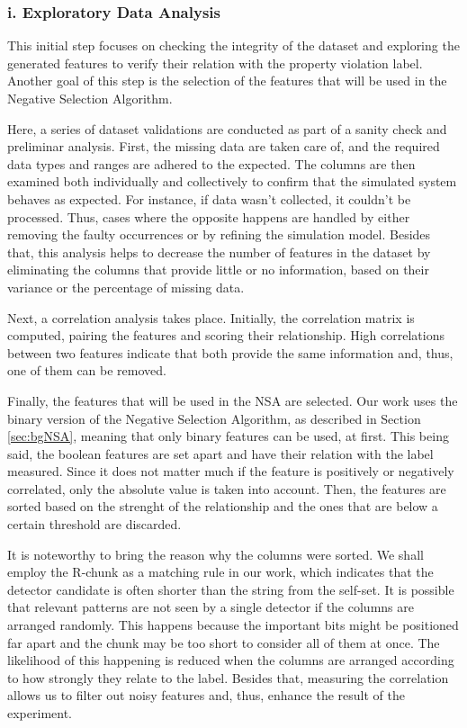 \subsubsection{i. Exploratory Data Analysis}

This initial step focuses on checking the integrity of the dataset and exploring the generated features to verify their relation with the property violation label. Another goal of this step is the selection of the features that will be used in the Negative Selection Algorithm.

Here, a series of dataset validations are conducted as part of a sanity check and preliminar analysis. First, the missing data are taken care of, and the required data types and ranges are adhered to the expected. The columns are then examined both individually and collectively to confirm that the simulated system behaves as expected. For instance, if data wasn't collected, it couldn't be processed. Thus, cases where the opposite happens are handled by either removing the faulty occurrences or by refining the simulation model. Besides that, this analysis helps to decrease the number of features in the dataset by eliminating the columns that provide little or no information, based on their variance or the percentage of missing data.

Next, a correlation analysis takes place. Initially, the correlation matrix is computed, pairing the features and scoring their relationship. High correlations between two features indicate that both provide the same information and, thus, one of them can be removed.

Finally, the features that will be used in the NSA are selected. Our work uses the binary version of the Negative Selection Algorithm, as described in Section \ref{sec:bgNSA}, meaning that only binary features can be used, at first. This being said, the boolean features are set apart and have their relation with the label measured. Since it does not matter much if the feature is positively or negatively correlated, only the absolute value is taken into account. Then, the features are sorted based on the strenght of the relationship and the ones that are below a certain threshold are discarded.

It is noteworthy to bring the reason why the columns were sorted. We shall employ the R-chunk as a matching rule in our work, which indicates that the detector candidate is often shorter than the string from the self-set. It is possible that relevant patterns are not seen by a single detector if the columns are arranged randomly. This happens because the important bits might be positioned far apart and the chunk may be too short to consider all of them at once. The likelihood of this happening is reduced when the columns are arranged according to how strongly they relate to the label. Besides that, measuring the correlation allows us to filter out noisy features and, thus, enhance the result of the experiment.

